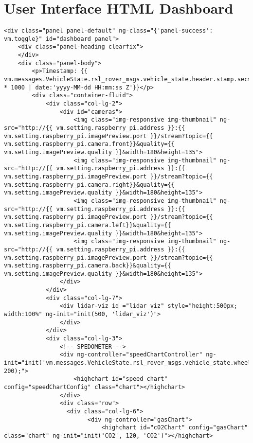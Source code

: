 \section{User Interface HTML Dashboard}
\begin{verbatim}
<div class="panel panel-default" ng-class="{'panel-success': vm.toggle}" id="dashboard_panel">
    <div class="panel-heading clearfix">
    </div>
    <div class="panel-body">
        <p>Timestamp: {{ vm.messages.VehicleState.rsl_rover_msgs.vehicle_state.header.stamp.secs * 1000 | date:'yyyy-MM-dd HH:mm:ss Z'}}</p>
        <div class="container-fluid">
            <div class="col-lg-2">
                <div id="cameras">
                    <img class="img-responsive img-thumbnail" ng-src="http://{{ vm.setting.raspberry_pi.address }}:{{ vm.setting.raspberry_pi.imagePreview.port }}/stream?topic={{ vm.setting.raspberry_pi.camera.front}}&quality={{ vm.setting.imagePreview.quality }}&width=180&height=135">
                    <img class="img-responsive img-thumbnail" ng-src="http://{{ vm.setting.raspberry_pi.address }}:{{ vm.setting.raspberry_pi.imagePreview.port }}/stream?topic={{ vm.setting.raspberry_pi.camera.right}}&quality={{ vm.setting.imagePreview.quality }}&width=180&height=135">
                    <img class="img-responsive img-thumbnail" ng-src="http://{{ vm.setting.raspberry_pi.address }}:{{ vm.setting.raspberry_pi.imagePreview.port }}/stream?topic={{ vm.setting.raspberry_pi.camera.left}}&quality={{ vm.setting.imagePreview.quality }}&width=180&height=135">
                    <img class="img-responsive img-thumbnail" ng-src="http://{{ vm.setting.raspberry_pi.address }}:{{ vm.setting.raspberry_pi.imagePreview.port }}/stream?topic={{ vm.setting.raspberry_pi.camera.back}}&quality={{ vm.setting.imagePreview.quality }}&width=180&height=135">
                </div>
            </div>
            <div class="col-lg-7">
                <div lidar-viz id ="lidar_viz" style="height:500px; width:100%" ng-init="init(500, 'lidar_viz')">
                </div>
            </div>
            <div class="col-lg-3">
                <!-- SPEDOMETER -->
                <div ng-controller="speedChartController" ng-init="init('vm.messages.VehicleState.rsl_rover_msgs.vehicle_state.wheel_speed', 200);">
                    <highchart id="speed_chart" config="speedChartConfig" class="chart"></highchart>
                </div>
                <div class="row">
                  <div class="col-lg-6">
                        <div ng-controller="gasChart">
                            <highchart id="c02Chart" config="gasChart" class="chart" ng-init="init('CO2', 120, 'CO2')"></highchart>

\end{verbatim}
